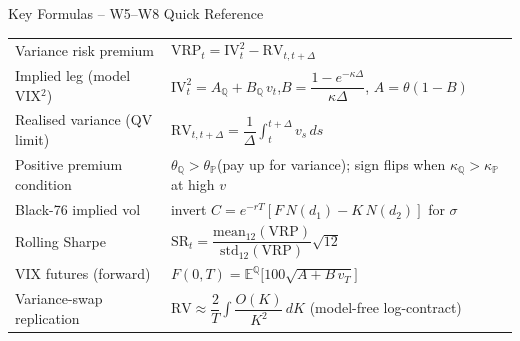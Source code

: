 \documentclass[aspectratio=169, 11pt]{beamer}
\begin{document}
\begin{frame}{Key Formulas -- W5--W8 Quick Reference}
\small
\renewcommand{\arraystretch}{1.7}
\begin{tabular}{@{}p{4.2cm}l@{}}
  \toprule
  Variance risk premium & $\mathrm{VRP}_t = \mathrm{IV}_t^2 - \mathrm{RV}_{t,t+\Delta}$ \\
  Implied leg (model VIX$^2$) & $\mathrm{IV}_t^2 = A_{\mathbb{Q}} + B_{\mathbb{Q}}\,v_t$,\quad $B=\dfrac{1-e^{-\kappa\Delta}}{\kappa\Delta}$,\;\; $A=\theta(1-B)$ \\
  Realised variance (QV limit) & $\mathrm{RV}_{t,t+\Delta} = \dfrac{1}{\Delta}\displaystyle\int_t^{t+\Delta} v_s\,ds$ \\
  Positive premium condition & $\theta_{\mathbb{Q}} > \theta_{\mathbb{P}}$\;\;(pay up for variance);\;\; sign flips when $\kappa_{\mathbb{Q}} > \kappa_{\mathbb{P}}$ at high $v$ \\
  Black-76 implied vol & invert $C = e^{-rT}\!\left[F\,N(d_1) - K\,N(d_2)\right]$ for $\sigma$ \\
  Rolling Sharpe & $\mathrm{SR}_t = \dfrac{\mathrm{mean}_{12}(\mathrm{VRP})}{\mathrm{std}_{12}(\mathrm{VRP})}\sqrt{12}$ \\
  VIX futures (forward) & $F(0,T)=\mathbb{E}^{\mathbb{Q}}\!\bigl[100\sqrt{A+B\,v_T}\bigr]$ \\
  Variance-swap replication & $\mathrm{RV}\approx \dfrac{2}{T}\!\displaystyle\int \dfrac{O(K)}{K^2}\,dK$ \;(model-free log-contract) \\
  \bottomrule
\end{tabular}
\end{frame}
\end{document}
